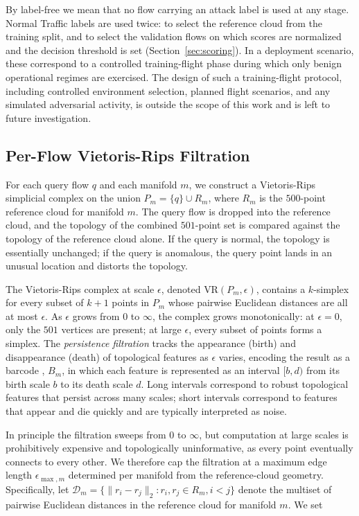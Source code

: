 \documentclass[conf]{new-aiaa}
\begin{document}
By label-free we mean that no flow carrying an attack label is used at any stage. Normal Traffic labels are used twice: to select the reference cloud from the training split, and to select the validation flows on which scores are normalized and the decision threshold is set (Section~\ref{sec:scoring}). In a deployment scenario, these correspond to a controlled training-flight phase during which only benign operational regimes are exercised. The design of such a training-flight protocol, including controlled environment selection, planned flight scenarios, and any simulated adversarial activity, is outside the scope of this work and is left to future investigation.

\subsection{Per-Flow Vietoris-Rips Filtration}
\label{sec:filtration}

For each query flow $q$ and each manifold $m$, we construct a Vietoris-Rips simplicial complex on the union $P_m = \{q\} \cup R_m$, where $R_m$ is the $500$-point reference cloud for manifold $m$. The query flow is dropped into the reference cloud, and the topology of the combined $501$-point set is compared against the topology of the reference cloud alone. If the query is normal, the topology is essentially unchanged; if the query is anomalous, the query point lands in an unusual location and distorts the topology.

The Vietoris-Rips complex at scale $\epsilon$, denoted $\text{VR}(P_m, \epsilon)$, contains a $k$-simplex for every subset of $k+1$ points in $P_m$ whose pairwise Euclidean distances are all at most $\epsilon$. As $\epsilon$ grows from $0$ to $\infty$, the complex grows monotonically: at $\epsilon = 0$, only the $501$ vertices are present; at large $\epsilon$, every subset of points forms a simplex. The \emph{persistence filtration} tracks the appearance (birth) and disappearance (death) of topological features as $\epsilon$ varies, encoding the result as a barcode \cite{Ghrist}, $B_m$, in which each feature is represented as an interval $[b, d)$ from its birth scale $b$ to its death scale $d$. Long intervals correspond to robust topological features that persist across many scales; short intervals correspond to features that appear and die quickly and are typically interpreted as noise.

In principle the filtration sweeps from $0$ to $\infty$, but computation at large scales is prohibitively expensive and topologically uninformative, as every point eventually connects to every other. We therefore cap the filtration at a maximum edge length $\epsilon_{\max,m}$ determined per manifold from the reference-cloud geometry. Specifically, let $\mathcal{D}_m = \{ \|r_i - r_j\|_2 : r_i, r_j \in R_m, i < j \}$ denote the multiset of pairwise Euclidean distances in the reference cloud for manifold $m$. We set
\end{document}
